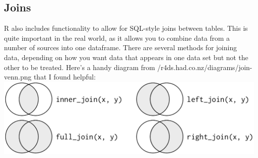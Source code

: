 \subsection{Joins}
R also includes functionality to allow for SQL-style joins between tables. This is quite important in the real world, as it allows you to combine data from a number of sources into one dataframe. There are several methods for joining data, depending on how you want data that appears in one data set but not the other to be treated. Here's a handy diagram from /r4ds.had.co.nz/diagrams/join-venn.png that I found helpful:\\ \includegraphics[width=\textwidth]{joins}\\
